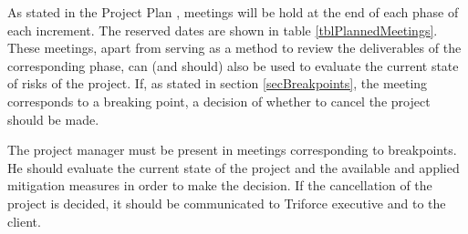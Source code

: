 
As stated in the Project Plan \cite{plan15}, meetings will be hold at the end of each phase of each increment. The reserved dates are shown in table \ref{tblPlannedMeetings}. These meetings, apart from serving as a method to review the deliverables of the corresponding phase, can (and should) also be used to evaluate the current state of risks of the project. If, as stated in section \ref{secBreakpoints}, the meeting corresponds to a breaking point, a decision of whether to cancel the project should be made.

The project manager must be present in meetings corresponding to breakpoints. He should evaluate the current state of the project and the available and applied mitigation measures in order to make the decision. If the cancellation of the project is decided, it should be communicated to Triforce executive and to the client.

